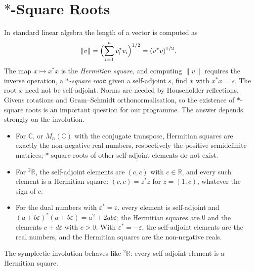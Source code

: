 \documentclass[12pt, a4paper]{report}
\theoremstyle{plain}
\theoremstyle{definition}
\theoremstyle{remark}
\theoremstyle{plain}
\newcommand{\RR}{\mathbb{R}}
\newcommand{\CC}{\mathbb{C}}
\newcommand{\twoR}{{}^{2}\mathbb{R}}
\begin{document}
\section{\texorpdfstring{$*$}{*}-Square Roots}
\label{sec:hermitian-sqrt}
In standard linear algebra the length of a vector is computed as
\[ \|v\| = \Bigl(\sum_{i=1}^n v_i^* v_i\Bigr)^{1/2} = (v^* v)^{1/2}. \]
The map $x \mapsto x^* x$ is the \emph{Hermitian square}, and computing $\|v\|$ requires the inverse operation, a \emph{$*$-square root}: given a self-adjoint $s$, find $x$ with $x^*x=s$. The root $x$ need not be self-adjoint. Norms are needed by Householder reflections, Givens rotations and Gram--Schmidt orthonormalisation, so the existence of $*$-square roots is an important question for our programme. The answer depends strongly on the involution.
\begin{itemize}
  \item For $\CC$, or $M_n(\CC)$ with the conjugate transpose, Hermitian squares are exactly the non-negative real numbers, respectively the positive semidefinite matrices; $*$-square roots of other self-adjoint elements do not exist.
  \item For $\twoR$, the self-adjoint elements are $(c,c)$ with $c\in\RR$, and every such element is a Hermitian square: $(c,c)=z^*z$ for $z=(1,c)$, whatever the sign of $c$.
  \item For the dual numbers with $\varepsilon^*=\varepsilon$, every element is self-adjoint and $(a+b\varepsilon)^*(a+b\varepsilon)=a^2+2ab\varepsilon$; the Hermitian squares are $0$ and the elements $c+d\varepsilon$ with $c>0$. With $\varepsilon^*=-\varepsilon$, the self-adjoint elements are the real numbers, and the Hermitian squares are the non-negative reals.
\end{itemize}
The symplectic involution behaves like $\twoR$: every self-adjoint element is a Hermitian square.
\end{document}
